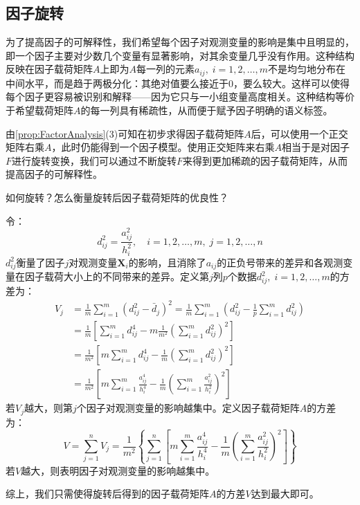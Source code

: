 \subsection{因子旋转}
为了提高因子的可解释性，我们希望每个因子对观测变量的影响是集中且明显的，即一个因子主要对少数几个变量有显著影响，对其余变量几乎没有作用。这种结构反映在因子载荷矩阵$A$上即为$A$每一列的元素$a_{ij},\;i=1,2,\dots,m$不是均匀地分布在中间水平，而是趋于两极分化：其绝对值要么接近于$0$，要么较大。这样可以使得每个因子更容易被识别和解释——因为它只与一小组变量高度相关。这种结构等价于希望载荷矩阵$A$的每一列具有稀疏性，从而便于赋予因子明确的语义标签。
\begin{derivation}
	由\cref{prop:FactorAnalysis}(3)可知在初步求得因子载荷矩阵$A$后，可以使用一个正交矩阵右乘$A$，此时仍能得到一个因子模型。使用正交矩阵来右乘$A$相当于是对因子$F$进行旋转变换，我们可以通过不断旋转$F$来得到更加稀疏的因子载荷矩阵，从而提高因子的可解释性。\par
	如何旋转？怎么衡量旋转后因子载荷矩阵的优良性？\par
	令：
	\begin{equation*}
		d_{ij}^2=\frac{a_{ij}^2}{h_i^2},\quad i=1,2,\dots,m,\;j=1,2,\dots,n
	\end{equation*}
	$d_{ij}^2$衡量了因子$j$对观测变量$\mathbf{X}_i$的影响，且消除了$a_{ij}$的正负号带来的差异和各观测变量在因子载荷大小上的不同带来的差异。定义第$j$列$p$个数据$d_{ij}^2,\;i=1,2,\dots,m$的方差为：
	\begin{align*}
		V_j&=\frac{1}{m}\sum_{i=1}^{m}(d_{ij}^2-\bar{d}_j)^2=\frac{1}{m}\sum_{i=1}^{m}\left(d_{ij}^2-\frac{1}{p}\sum_{i=1}^{m}d_{ij}^2\right) \\
		&=\frac{1}{m}\left[\sum_{i=1}^{m}d_{ij}^4-m\frac{1}{m^2}\left(\sum_{i=1}^{m}d_{ij}^2\right)^2\right] \\
		&=\frac{1}{m^2}\left[m\sum_{i=1}^{m}d_{ij}^4-\frac{1}{m}\left(\sum_{i=1}^{m}d_{ij}^2\right)^2\right] \\
		&=\frac{1}{m^2}\left[m\sum_{i=1}^{m}\frac{a_{ij}^4}{h_i^4}-\frac{1}{m}\left(\sum_{i=1}^{m}\frac{a_{ij}^2}{h_i^2}\right)^2\right]
	\end{align*}
	若$V_j$越大，则第$j$个因子对观测变量的影响越集中。定义因子载荷矩阵$A$的方差为：
	\begin{equation*}
		V=\sum_{j=1}^{n}V_j=\frac{1}{m^2}\left\{\sum_{j=1}^{n}\left[m\sum_{i=1}^{m}\frac{a_{ij}^4}{h_i^4}-\frac{1}{m}\left(\sum_{i=1}^{m}\frac{a_{ij}^2}{h_i^2}\right)^2\right]\right\}
	\end{equation*}
	若$V$越大，则表明因子对观测变量的影响越集中。\par
	综上，我们只需使得旋转后得到的因子载荷矩阵$A$的方差$V$达到最大即可。
\end{derivation}

